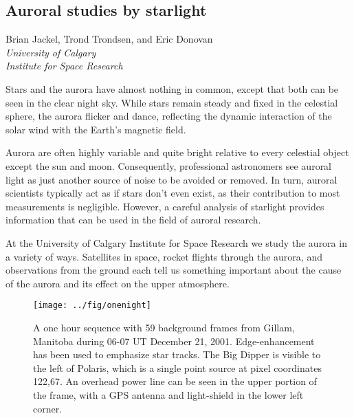 \documentclass[11pt,twoside]{article}   %
\begin{document}
\begin{center}
\section*{\quad Auroral studies by starlight\quad }


 \parbox{4in}{\centering
     Brian Jackel, Trond Trondsen, and Eric Donovan \\[2ex]
     \it University of Calgary \\
     Institute for Space Research }
\end{center}

\begin{multicols}{2}
Stars and the aurora have almost nothing in common, except that
both can be seen in the clear night sky. While stars remain steady
and fixed in the celestial sphere, the aurora flicker and dance,
reflecting the dynamic interaction of the solar wind with the
Earth's magnetic field.

Aurora are often highly variable and quite bright relative to
every celestial object except the sun and moon.  Consequently,
professional astronomers see auroral light as just another source
of noise to be avoided or removed. In turn, auroral scientists
typically act as if stars don't even exist, as their contribution
to most measurements is negligible.  However, a careful analysis
of starlight provides information that can be used in the field of
auroral research.

At the University of Calgary Institute for Space Research we study
the aurora in a variety of ways.  Satellites in space, rocket
flights through the aurora, and observations from the ground each
tell us something important about the cause of the aurora and its
effect on the upper atmosphere.

\begin{figure*}[htb!]
  \texttt{[image: ../fig/onenight]}
    \caption[A one hour sequence.]
   {A one hour sequence with 59 background frames from Gillam,
   Manitoba during 06-07 UT December 21, 2001.  Edge-enhancement has
   been used to emphasize star tracks.
   The Big Dipper is visible to the left of Polaris, which is
   a single point source at pixel coordinates 122,67.
   An overhead power line can be seen in the upper portion
   of the frame, with a GPS antenna and light-shield in the lower left corner.
     \label{fig:onenight}  }
\end{figure*}


\end{multicols}
\end{document}
